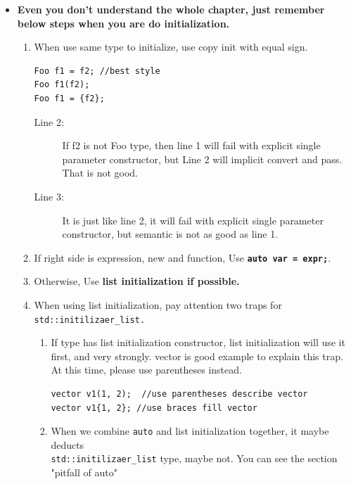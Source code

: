 \documentclass[a4paper,11pt,twoside]{book}
\begin{document}
\begin{itemize}
	\item \textbf{Even you don't understand the whole chapter, just remember below steps when you are do initialization.}
	\begin{enumerate}
		\item When use same type to initialize, use copy init with equal sign.
\begin{lstlisting}
Foo f1 = f2; //best style
Foo f1(f2);  
Foo f1 = {f2}; 
\end{lstlisting}
\begin{description}
	\item[Line 2:] If f2 is not Foo type, then line 1 will fail with explicit single parameter constructor, but Line 2 will implicit convert and pass. That is not good.
	
	\item[Line 3:] It is just like line 2, it will fail with explicit single parameter constructor, but semantic is not as good as line 1.
\end{description}
		\item If right side is expression, new and function, Use \textbf{\texttt{auto var = expr;}}. 
		
		\item Otherwise, Use \textbf{list initialization if possible.} 
		
		\item When using list initialization, pay attention two traps for \texttt{std::initilizaer\_list.} 
		\begin{enumerate}
			\item If type has list initialization constructor, list initialization will use it first, and very strongly. vector is good example to explain this trap. At this time, please use parentheses instead.
\begin{lstlisting}
vector v1(1, 2);  //use parentheses describe vector 
vector v1{1, 2}; //use braces fill vector
\end{lstlisting}
			
			\item When we combine \texttt{auto} and list initialization together, it maybe deducts \\ \texttt{std::initilizaer\_list} type, maybe not.  You can see the section "pitfall of auto" 
		\end{enumerate}
	\end{enumerate}
	
\end{itemize}
\end{document}
